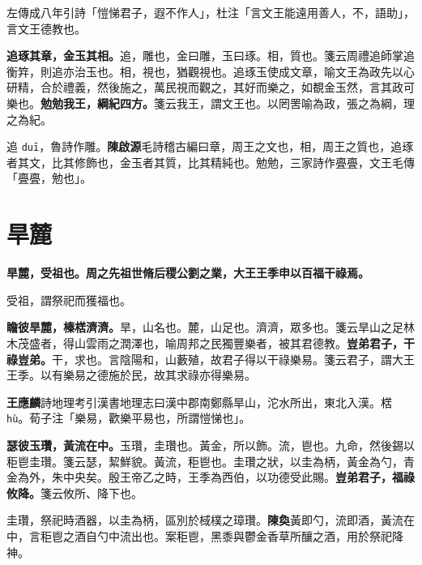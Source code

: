 \begin{quoting}左傳成八年引詩「愷悌君子，遐不作人」，杜注「言文王能遠用善人，不，語助」，言文王德教也。\end{quoting}

\textbf{追琢其章，金玉其相。}{\footnotesize 追，雕也，金曰雕，玉曰琢。相，質也。箋云周禮追師掌追衡筓，則追亦治玉也。相，視也，猶觀視也。追琢玉使成文章，喻文王為政先以心研精，合於禮義，然後施之，萬民視而觀之，其好而樂之，如覩金玉然，言其政可樂也。}\textbf{勉勉我王，綱紀四方。}{\footnotesize 箋云我王，謂文王也。以罔罟喻為政，張之為綱，理之為紀。}

\begin{quoting}追 \texttt{duī}，魯詩作雕。\textbf{陳啟源}毛詩稽古編曰章，周王之文也，相，周王之質也，追琢者其文，比其修飾也，金玉者其質，比其精純也。勉勉，三家詩作亹亹，文王毛傳「亹亹，勉也」。\end{quoting}

\section{旱麓}


\textbf{旱麓，受祖也。周之先祖世脩后稷公劉之業，大王王季申以百福干祿焉。}

\begin{quoting}受祖，謂祭祀而獲福也。\end{quoting}

\textbf{瞻彼旱麓，榛楛濟濟。}{\footnotesize 旱，山名也。麓，山足也。濟濟，眾多也。箋云旱山之足林木茂盛者，得山雲雨之潤澤也，喻周邦之民獨豐樂者，被其君德教。}\textbf{豈弟君子，干祿豈弟。}{\footnotesize 干，求也。言陰陽和，山藪殖，故君子得以干祿樂易。箋云君子，謂大王王季。以有樂易之德施於民，故其求祿亦得樂易。}

\begin{quoting}\textbf{王應麟}詩地理考引漢書地理志曰漢中郡南鄭縣旱山，沱水所出，東北入漢。楛 \texttt{hù}。荀子注「樂易，歡樂平易也，所謂愷悌也」。\end{quoting}

\textbf{瑟彼玉瓚，黃流在中。}{\footnotesize 玉瓚，圭瓚也。黃金，所以飾。流，鬯也。九命，然後錫以秬鬯圭瓚。箋云瑟，絜鮮貌。黃流，秬鬯也。圭瓚之狀，以圭為柄，黃金為勺，青金為外，朱中央矣。殷王帝乙之時，王季為西伯，以功德受此賜。}\textbf{豈弟君子，福祿攸降。}{\footnotesize 箋云攸所、降下也。}

\begin{quoting}圭瓚，祭祀時酒器，以圭為柄，區別於棫樸之璋瓚。\textbf{陳奐}黃即勺，流即酒，黃流在中，言秬鬯之酒自勺中流出也。案秬鬯，黑黍與鬱金香草所釀之酒，用於祭祀降神。\end{quoting}

